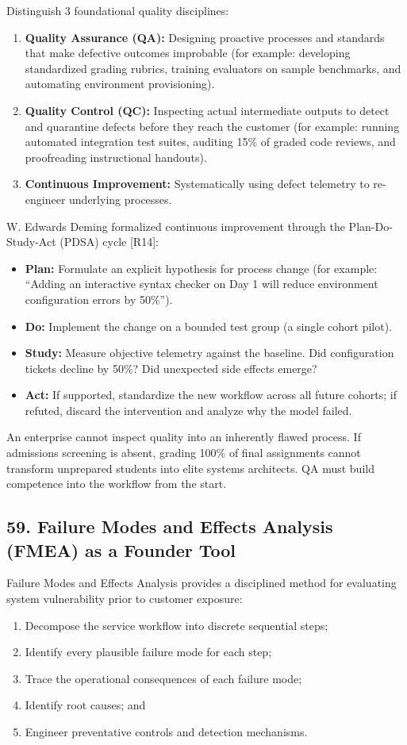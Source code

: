 Distinguish 3 foundational quality disciplines:
\begin{enumerate}
    \item \textbf{Quality Assurance (QA):} Designing proactive processes and standards that make defective outcomes improbable (for example: developing standardized grading rubrics, training evaluators on sample benchmarks, and automating environment provisioning).
    \item \textbf{Quality Control (QC):} Inspecting actual intermediate outputs to detect and quarantine defects before they reach the customer (for example: running automated integration test suites, auditing 15\% of graded code reviews, and proofreading instructional handouts).
    \item \textbf{Continuous Improvement:} Systematically using defect telemetry to re-engineer underlying processes.
\end{enumerate}

W. Edwards Deming formalized continuous improvement through the Plan-Do-Study-Act (PDSA) cycle [R14]:
\begin{itemize}
    \item \textbf{Plan:} Formulate an explicit hypothesis for process change (for example: ``Adding an interactive syntax checker on Day 1 will reduce environment configuration errors by 50\%'').
    \item \textbf{Do:} Implement the change on a bounded test group (a single cohort pilot).
    \item \textbf{Study:} Measure objective telemetry against the baseline. Did configuration tickets decline by 50\%? Did unexpected side effects emerge?
    \item \textbf{Act:} If supported, standardize the new workflow across all future cohorts; if refuted, discard the intervention and analyze why the model failed.
\end{itemize}

An enterprise cannot inspect quality into an inherently flawed process. If admissions screening is absent, grading 100\% of final assignments cannot transform unprepared students into elite systems architects. QA must build competence into the workflow from the start.

\subsection*{59. Failure Modes and Effects Analysis (FMEA) as a Founder Tool}

Failure Modes and Effects Analysis provides a disciplined method for evaluating system vulnerability prior to customer exposure:
\begin{enumerate}
    \item Decompose the service workflow into discrete sequential steps;
    \item Identify every plausible failure mode for each step;
    \item Trace the operational consequences of each failure mode;
    \item Identify root causes; and
    \item Engineer preventative controls and detection mechanisms.
\end{enumerate}

